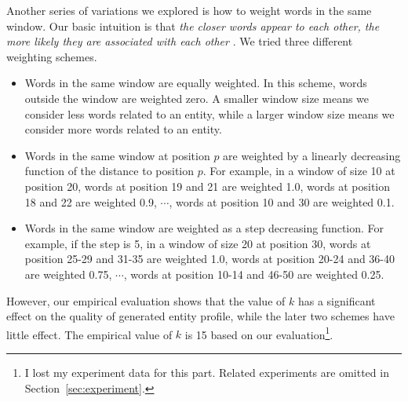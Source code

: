 \documentclass{sig-alternate}
\theoremstyle{definition}
\begin{document}
Another series of variations we explored is how to weight words in the same window. Our basic intuition is that {\em the closer words appear to each other, the more likely they are associated with each other} \cite{cheng2007entityrank}. We tried three different weighting schemes.
\begin{itemize}
\item[1)] Words in the same window are equally weighted. In this scheme, words outside the window are weighted zero. A smaller window size means we consider less words related to an entity, while a larger window size means we consider more words related to an entity.
\item[2)] Words in the same window at position $p$ are weighted by a linearly decreasing function of the distance to position $p$. For example, in a window of size 10 at position 20, words at position 19 and 21 are weighted 1.0, words at position 18 and 22 are weighted 0.9, $\cdots$, words at position 10 and 30 are weighted 0.1.
\item[3)] Words in the same window are weighted as a step decreasing function. For example, if the step is 5, in a window of size 20 at position 30, words at position 25-29 and 31-35 are weighted 1.0, words at position 20-24 and 36-40 are weighted 0.75, $\cdots$, words at position 10-14 and 46-50 are weighted 0.25.
\end{itemize}
However, our empirical evaluation shows that the value of $k$ has a significant effect on the quality of generated entity profile, while the later two schemes have little effect. The empirical value of $k$ is 15 based on our evaluation\footnote{I lost my experiment data for this part. Related experiments are omitted in Section~\ref{sec:experiment}.}.
\end{document}
